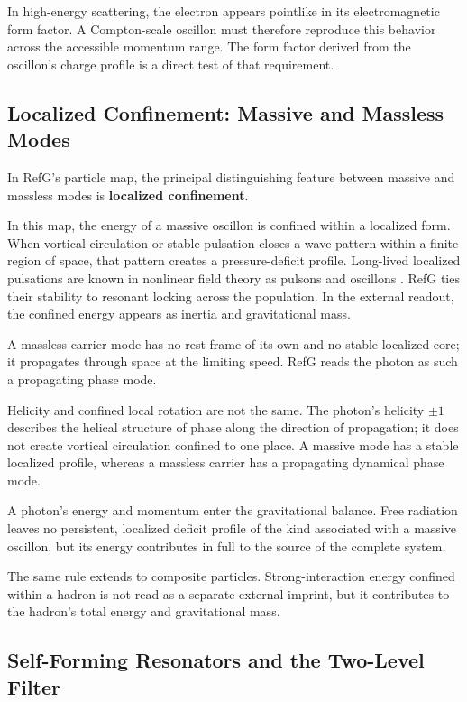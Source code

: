 \documentclass[11pt,a4paper]{article}
\begin{document}
In high-energy scattering, the electron appears pointlike in its electromagnetic form factor. A Compton-scale oscillon must therefore reproduce this behavior across the accessible momentum range. The form factor derived from the oscillon's charge profile is a direct test of that requirement.

\subsection{Localized Confinement: Massive and Massless Modes}

In RefG's particle map, the principal distinguishing feature between massive and massless modes is \textbf{localized confinement}.

In this map, the energy of a massive oscillon is confined within a localized form. When vortical circulation or stable pulsation closes a wave pattern within a finite region of space, that pattern creates a pressure-deficit profile. Long-lived localized pulsations are known in nonlinear field theory as pulsons and oscillons \citep{bogolyubsky1976,gleiser1994,copeland1995}. RefG ties their stability to resonant locking across the population. In the external readout, the confined energy appears as inertia and gravitational mass.

A massless carrier mode has no rest frame of its own and no stable localized core; it propagates through space at the limiting speed. RefG reads the photon as such a propagating phase mode.

Helicity and confined local rotation are not the same. The photon's helicity $\pm1$ describes the helical structure of phase along the direction of propagation; it does not create vortical circulation confined to one place. A massive mode has a stable localized profile, whereas a massless carrier has a propagating dynamical phase mode.

A photon's energy and momentum enter the gravitational balance. Free radiation leaves no persistent, localized deficit profile of the kind associated with a massive oscillon, but its energy contributes in full to the source of the complete system.

The same rule extends to composite particles. Strong-interaction energy confined within a hadron is not read as a separate external imprint, but it contributes to the hadron's total energy and gravitational mass.

\subsection{Self-Forming Resonators and the Two-Level Filter}
\end{document}
